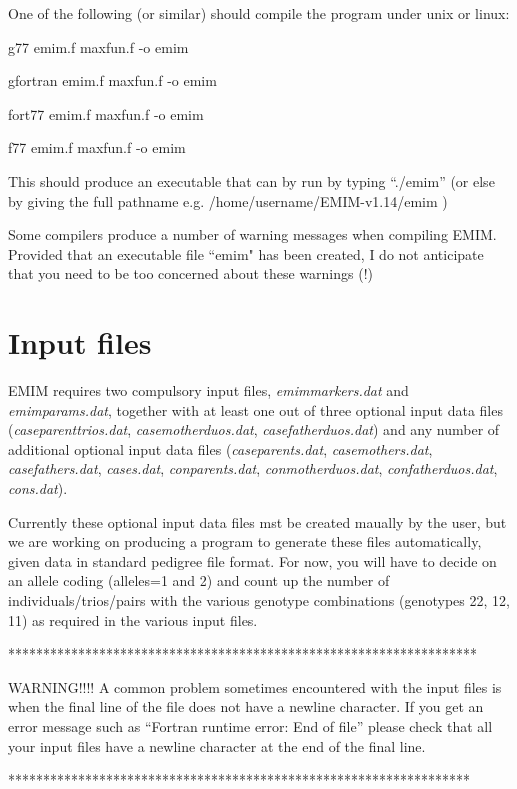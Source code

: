 \documentclass[a4paper,11pt]{report}
\begin{document}
One of the following (or similar) should compile the program
under unix or linux:

\vspace{0.2in}

g77 emim.f maxfun.f -o emim

gfortran emim.f maxfun.f -o emim

fort77 emim.f maxfun.f -o emim

f77 emim.f maxfun.f -o emim

\vspace{0.2in}

This should produce an executable that can by run by typing
``./emim'' (or else by giving the full pathname e.g. /home/username/EMIM-v1.14/emim )


\vspace{0.2in}

Some compilers produce a number of warning messages when compiling EMIM. Provided that an executable file ``emim" has been created, I do not anticipate that you need to be too concerned about these warnings (!)


\newpage

\section*{Input files}

EMIM requires two compulsory input files, {\it emimmarkers.dat} and {\it emimparams.dat}, together with at least one out of 
three optional input data
files ({\it caseparenttrios.dat}, {\it casemotherduos.dat}, {\it casefatherduos.dat}) and any number of additional optional input data
files  ({\it caseparents.dat}, {\it casemothers.dat}, {\it casefathers.dat}, {\it cases.dat}, {\it conparents.dat}, {\it conmotherduos.dat}, {\it confatherduos.dat}, {\it cons.dat}).

Currently these optional input data files mst be created maually by the user, but we are working on producing a program to generate these files automatically, given data in standard pedigree file format. For now, you will have to
decide on an allele coding (alleles=1 and 2) and count up the number of individuals/trios/pairs with the various
genotype combinations (genotypes 22, 12, 11) as required in the various input files.


{\bf 

*******************************************************************

WARNING!!!! A common problem sometimes encountered with the input files is when the final line of the file does not have a newline character. If you get an error message
such as ``Fortran runtime error: End of file'' please check that all your input files have  a newline character at the end of the final line.

******************************************************************
}
\end{document}
